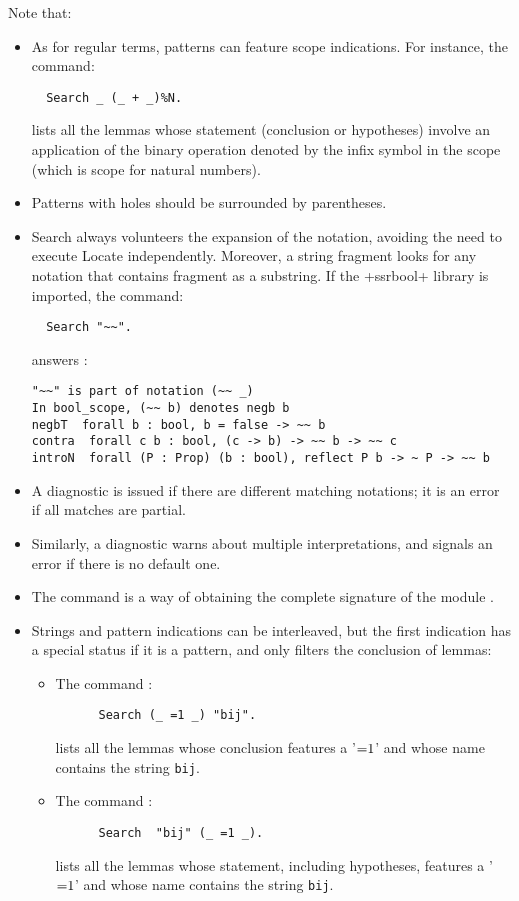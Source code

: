 Note that:
\begin{itemize}
\item As for regular terms, patterns can feature scope
  indications. For instance, the command:
\begin{lstlisting}
  Search _ (_ + _)%N.
\end{lstlisting}
lists all the lemmas whose statement (conclusion or hypotheses)
involve an application of the binary operation denoted by the infix
\ssrC{+} symbol in the  scope (which is \ssr{} scope for natural numbers).
\item Patterns with holes should be surrounded by parentheses.
\item Search always volunteers the expansion of the notation, avoiding the
  need to execute Locate independently. Moreover, a string fragment
  looks for any notation that contains fragment as
  a substring. If the \ssrL+ssrbool+ library is imported, the command:
\begin{lstlisting}
  Search "~~".
\end{lstlisting}
answers :
\begin{lstlisting}
"~~" is part of notation (~~ _)
In bool_scope, (~~ b) denotes negb b
negbT  forall b : bool, b = false -> ~~ b
contra  forall c b : bool, (c -> b) -> ~~ b -> ~~ c
introN  forall (P : Prop) (b : bool), reflect P b -> ~ P -> ~~ b
\end{lstlisting}
 \item A diagnostic is issued if there are different matching notations;
  it is an error if all matches are partial.
\item Similarly, a diagnostic warns about multiple interpretations, and
  signals an error if there is no default one.
\item The command  
is a way of obtaining the complete signature of the module .
\item Strings and pattern indications can be interleaved, but the
  first indication has a special status if it is a pattern, and only
  filters the conclusion of lemmas:
\begin{itemize}
  \item The command :
    \begin{lstlisting}
      Search (_ =1 _) "bij".
    \end{lstlisting}
lists all the lemmas whose conclusion features a '$\ssrC{=1}$' and whose
name contains the string \verb+bij+.
\item The command :
    \begin{lstlisting}
      Search  "bij" (_ =1 _).
    \end{lstlisting}
lists all the lemmas whose statement, including hypotheses, features a
'$\ssrC{=1}$' and whose name contains the string \verb+bij+.

\end{itemize}

\end{itemize}
